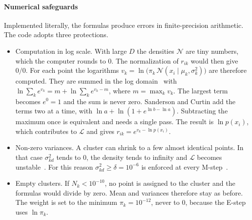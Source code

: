 \documentclass[conference,onecolumn]{IEEEtran}
\begin{document}
\begin{table}[t]
\centering
\caption{Differences between the two models.}\label{tab:models}
\footnotesize
{}
\end{table}

\paragraph{Numerical safeguards} Implemented literally, the formulas produce errors in finite-precision arithmetic. The code adopts three protections.
\begin{itemize}
\item Computation in log scale. With large $D$ the densities $\mathcal{N}$ are tiny numbers, which the computer rounds to 0. The normalization of $r_{ik}$ would then give $0/0$. For each point the logarithms $v_k=\ln\big(\pi_k\,\mathcal{N}(x_i\mid\mu_k,\sigma_k^2)\big)$ are therefore computed. They are summed in the log domain~\cite[Sec.~2.2]{sanderson} with
$\ln\sum_{k}e^{v_k}=m+\ln\sum_{k}e^{v_k-m}$, where $m=\max_k v_k$. The largest term becomes $e^0=1$ and the sum is never zero. Sanderson and Curtin add the terms two at a time, with $\ln a+\ln(1+e^{\ln b-\ln a})$. Subtracting the maximum once is equivalent and needs a single pass. The result is $\ln p(x_i)$, which contributes to $\mathcal{L}$ and gives $r_{ik}=e^{v_k-\ln p(x_i)}$.
\item Non-zero variances. A cluster can shrink to a few almost identical points. In that case $\sigma^2_{kd}$ tends to 0, the density tends to infinity and $\mathcal{L}$ becomes unstable~\cite[Sec.~9.2.1]{bishop}. For this reason $\sigma^2_{kd}\ge\delta=10^{-6}$ is enforced at every M-step~\cite[Sec.~2.2]{sanderson}.
\item Empty clusters. If $N_k<10^{-10}$, no point is assigned to the cluster and the formulas would divide by zero. Mean and variances therefore stay as before. The weight is set to the minimum $\pi_k=10^{-12}$, never to 0, because the E-step uses $\ln\pi_k$.
\end{itemize}
\end{document}
